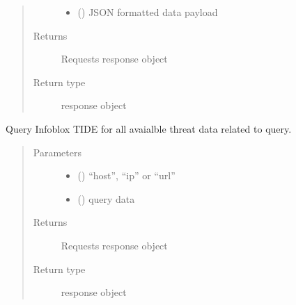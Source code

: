 \documentclass[letterpaper,10pt,english]{sphinxmanual}
\begin{document}
\begin{fulllineitems}
\begin{fulllineitems}
\begin{quote}
\begin{description}
\begin{itemize}
\item {} 
\sphinxAtStartPar
{} () \textendash{} JSON formatted data payload

\end{itemize}

\item[{Returns}] \leavevmode
\sphinxAtStartPar
Requests response object

\item[{Return type}] \leavevmode
\sphinxAtStartPar
response object

\end{description}\end{quote}

\end{fulllineitems}


\begin{fulllineitems}
\label{\detokenize{b1td-class:bloxone.b1td.querytide}}
\sphinxAtStartPar
Query Infoblox TIDE for all avaialble threat data
related to query.
\begin{quote}\begin{description}
\item[{Parameters}] \leavevmode\begin{itemize}
\item {} 
\sphinxAtStartPar
{} () \textendash{} “host”, “ip” or “url”

\item {} 
\sphinxAtStartPar
{} () \textendash{} query data

\end{itemize}

\item[{Returns}] \leavevmode
\sphinxAtStartPar
Requests response object

\item[{Return type}] \leavevmode
\sphinxAtStartPar
response object

\end{description}\end{quote}


\end{fulllineitems}
\end{fulllineitems}
\end{document}
